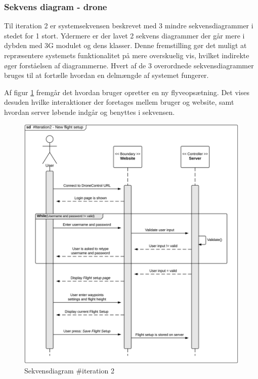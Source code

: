 \newpage

\subsubsection*{Sekvens diagram - drone}

Til iteration 2 er systemsekvensen beskrevet med 3 mindre sekvensdiagrammer i stedet for 1 stort. Ydermere er der lavet 2 sekvens diagrammer der går mere i dybden med 3G modulet og dens klasser. 
Denne fremstilling gør det muligt at repræsentere systemets funktionalitet på mere overskuelig vis, hvilket indirekte øger forståelsen af diagrammerne. Hvert af de 3 overordnede sekvensdiagrammer bruges til at fortælle hvordan en delmængde af systemet fungerer.

Af figur \ref{fig:Sekvens_diagram_iteration2_1} fremgår det hvordan bruger opretter en ny flyveopsætning. Det vises desuden hvilke interaktioner der foretages mellem bruger og website, samt hvordan server løbende indgår og benyttes i sekvensen. 

\begin{figure}[H]
	\centering
	\includegraphics[width=1\textwidth]{Billeder/sekvens/sekvens_iteration2_1}
	\caption{Sekvensdiagram \#iteration 2}
	\label{fig:Sekvens_diagram_iteration2_1}
\end{figure}


